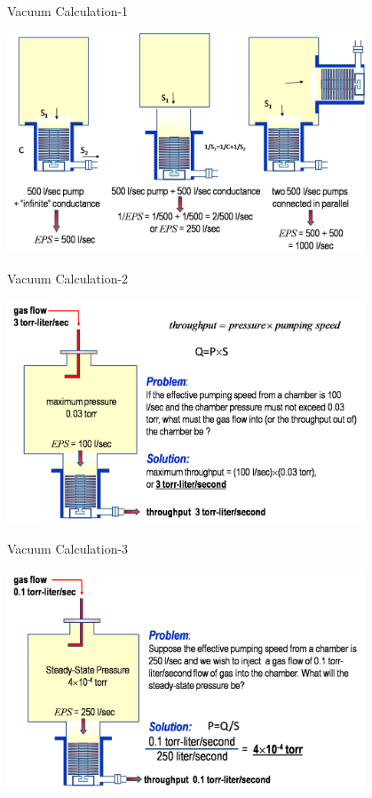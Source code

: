 \documentclass[11]{beamer}
\begin{document}
\begin{frame}{Vacuum Calculation-1}

 \begin{center}
		\includegraphics[width=0.8\textwidth]{VacuumCalculation1.png}
	\end{center}
\end{frame}


\begin{frame}{Vacuum Calculation-2}

 \begin{center}
		\includegraphics[width=0.8\textwidth]{VacuumCalculation2.png}
	\end{center}
\end{frame}


\begin{frame}{Vacuum Calculation-3}

 \begin{center}
		\includegraphics[width=0.8\textwidth]{VacuumCalculation3.png}
	\end{center}
\end{frame}
\end{document}
